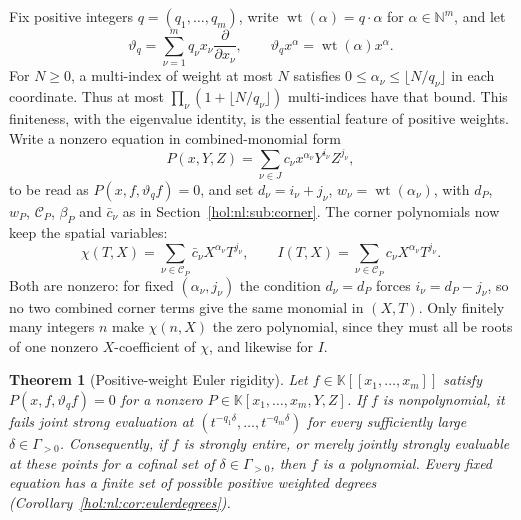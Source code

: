 \documentclass[11pt]{article}
\numberwithin{equation}{section}
\newtheorem{theorem}{Theorem}[section]
\theoremstyle{definition}
\theoremstyle{remark}
\newcommand{\N}{\mathbb N}
\newcommand{\KK}{\mathbb K}
\newcommand{\wt}{\operatorname{wt}}
\begin{document}
Fix positive integers $q=(q_1,\ldots,q_m)$, write
$\wt(\alpha)=q\cdot\alpha$ for $\alpha\in\N^m$, and let
\[
 \vartheta_q=\sum_{\nu=1}^mq_\nu x_\nu\frac{\partial}{\partial x_\nu},
 \qquad \vartheta_qx^\alpha=\wt(\alpha)x^\alpha.
\]
For $N\ge0$, a multi-index of weight at most $N$ satisfies
$0\le\alpha_\nu\le\lfloor N/q_\nu\rfloor$ in each coordinate. Thus at most
$\prod_\nu(1+\lfloor N/q_\nu\rfloor)$ multi-indices have that bound. This
finiteness, with the eigenvalue identity, is the essential feature of
positive weights.
Write a nonzero equation in combined-monomial form
\begin{equation}\label{hol:nl:eq:eulerP}
 P(x,Y,Z)=\sum_{\nu\in J}c_\nu x^{\alpha_\nu}Y^{i_\nu}Z^{j_\nu},
\end{equation}
to be read as $P(x,f,\vartheta_qf)=0$, and set
$d_\nu=i_\nu+j_\nu$, $w_\nu=\wt(\alpha_\nu)$, with $d_P$, $w_P$,
$\mathcal C_P$, $\beta_P$ and $\bar c_\nu$ as in
Section~\ref{hol:nl:sub:corner}. The corner polynomials now keep the spatial
variables:
\begin{equation}\label{hol:nl:eq:eulerchi}
 \chi(T,X)=\sum_{\nu\in\mathcal C_P}\bar c_\nu X^{\alpha_\nu}T^{j_\nu},\qquad
 I(T,X)=\sum_{\nu\in\mathcal C_P}c_\nu X^{\alpha_\nu}T^{j_\nu}.
\end{equation}
Both are nonzero: for fixed $(\alpha_\nu,j_\nu)$ the condition $d_\nu=d_P$
forces $i_\nu=d_P-j_\nu$, so no two combined corner terms give the same
monomial in $(X,T)$. Only finitely many integers $n$ make $\chi(n,X)$ the zero
polynomial, since they must all be roots of one nonzero $X$-coefficient of
$\chi$, and likewise for $I$.

\begin{theorem}[Positive-weight Euler rigidity]\label{hol:nl:thm:euler}
Let $f\in\KK[[x_1,\ldots,x_m]]$ satisfy $P(x,f,\vartheta_qf)=0$ for a nonzero
$P\in\KK[x_1,\ldots,x_m,Y,Z]$. If $f$ is nonpolynomial, it fails joint strong
evaluation at $(t^{-q_1\delta},\ldots,t^{-q_m\delta})$ for every sufficiently
large $\delta\in\Gamma_{>0}$. Consequently, if $f$ is strongly entire, or
merely jointly strongly evaluable at these points for a cofinal set of
$\delta\in\Gamma_{>0}$, then $f$ is a polynomial. Every fixed equation has a
finite set of possible positive weighted degrees
(Corollary~\ref{hol:nl:cor:eulerdegrees}).
\end{theorem}
\end{document}
